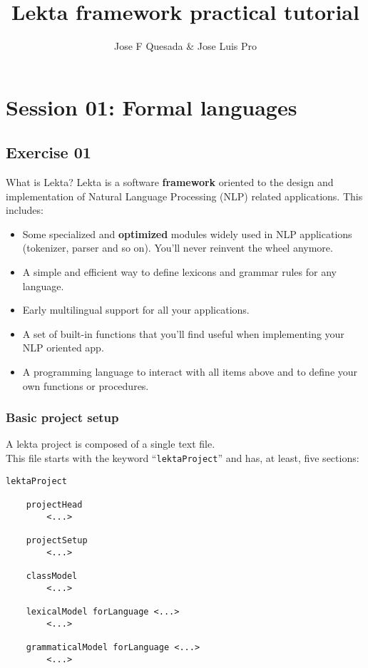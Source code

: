 \documentclass[11pt]{beamer}
\title[Lekta framework practical tutorial]{Lekta framework practical tutorial}
\author{Jose F Quesada \& Jose Luis Pro}
\date{}
\begin{document}
\begin{frame}
\titlepage
\end{frame}

\section{Session 01: Formal languages}

\subsection{Exercise 01}

\begin{frame}
	\begin{block}{What is Lekta?}
			Lekta is a software \textbf{framework} oriented to the design and implementation of Natural Language Processing (NLP) related applications. This includes:
			\pause
			\begin{itemize}
				\item Some specialized and \textbf{optimized} modules widely used in NLP applications (tokenizer, parser and so on). You'll never reinvent the wheel anymore.
				\pause
				\item A simple and efficient way to define lexicons and grammar rules for any language.
				\pause
				\item Early multilingual support for all your applications.
				\pause
				\item A set of built-in functions that you'll find useful when implementing your NLP oriented app.
				\pause
				\item A programming language to interact with all items above and to define your own functions or procedures.
			\end{itemize}
	\end{block}
\end{frame}

\begin{frame}[fragile]
\frametitle{Basic project setup}
A lekta project is composed of a single text file.\\
\vspace{5pt}
\pause
This file starts with the keyword ``\texttt{lektaProject}'' and has, at least, five sections:
\vspace{5pt}
\pause
\scriptsize
\begin{lstlisting}[language=lekta]
lektaProject

	projectHead
		<...>

	projectSetup
		<...>
		
	classModel
		<...>

	lexicalModel forLanguage <...>
		<...>
		
	grammaticalModel forLanguage <...>
		<...>

\end{lstlisting}
\end{frame}
\end{document}
